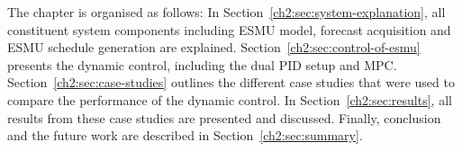 The chapter is organised as follows:
In Section~\ref{ch2:sec:system-explanation}, all constituent system components including ESMU model, forecast acquisition and ESMU schedule generation are explained.
Section~\ref{ch2:sec:control-of-esmu} presents the dynamic control, including the dual PID setup and MPC.
Section~\ref{ch2:sec:case-studies} outlines the different case studies that were used to compare the performance of the dynamic control.
In Section~\ref{ch2:sec:results}, all results from these case studies are presented and discussed.
Finally, conclusion and the future work are described in Section~\ref{ch2:sec:summary}.










